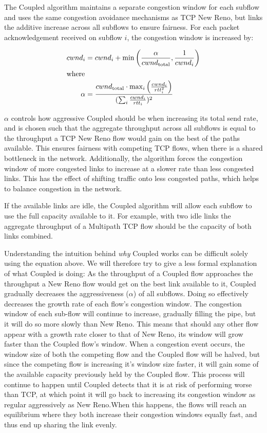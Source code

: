 The Coupled algorithm maintains a separate congestion window for each subflow
and uses the same congestion avoidance mechanisms as TCP New Reno, but links the
additive increase across all subflows to ensure fairness. For each packet
acknowledgement received on subflow $i$, the congestion window is increased by:

\begin{align*}
  cwnd_i &= cwnd_i +
    \min\left(\frac{\alpha}{cwnd_\text{total}}, \frac{1}{cwnd_i}\right) \\
  \intertext{where}
  \alpha &=
    \frac{cwnd_\text{total} \cdot \max_i\left(\frac{cwnd_i}{rtt_i^2}\right)}
         {(\sum_i \frac{cwnd_i}{rtt_i})^2}
\end{align*}

$\alpha$ controls how aggressive Coupled should be when
increasing its total send rate, and is chosen such that the aggregate throughput
across all subflows is equal to the throughput a TCP New Reno flow would gain on
the best of the paths available. This ensures fairness with competing TCP flows,
when there is a shared bottleneck in the network.
Additionally, the algorithm forces the congestion window of more congested links
to increase at a slower rate than less congested links. This has the effect of
shifting traffic onto less congested paths, which helps to balance congestion in
the network.

If the available links are idle, the Coupled algorithm will allow each
subflow to use the full capacity available to it. For example, with two idle
links the aggregate throughput of a Multipath TCP flow should be the capacity of
both links combined.

Understanding the intuition behind \textit{why} Coupled works can be difficult
solely using the equation above. We will therefore try to give a less formal
 explanation of what Coupled is doing: As the throughput of a Coupled
flow approaches the throughput a New Reno flow would get on the best link
available to it, Coupled gradually decreases the aggressiveness ($\alpha$)
of all subflows. Doing so effectively decreases the growth rate of each flow's
congestion window. The congestion window of each sub-flow will continue to increase,
gradually filling the pipe, but it will do so more slowly than New Reno. This means that
should any other flow appear with a growth rate closer to that of New Reno, its
window will grow faster than the Coupled flow's window. When a congestion event
occurs, the window size of both the competing flow and the Coupled
flow will be halved, but since the competing flow is increasing it's window size faster,
it will gain some of the available capacity previously held by the Coupled flow.
This process will continue to happen until Coupled detects that it is at risk of
performing worse than TCP, at which point it will go back to increasing its
congestion window as regular aggressively as New Reno.\@ When this happens, the flows will
reach an equilibrium where they both increase their congestion windows equally
fast, and thus end up sharing the link evenly.

